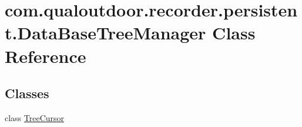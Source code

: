 \hypertarget{classcom_1_1qualoutdoor_1_1recorder_1_1persistent_1_1DataBaseTreeManager}{\section{com.\-qualoutdoor.\-recorder.\-persistent.\-Data\-Base\-Tree\-Manager Class Reference}
\label{classcom_1_1qualoutdoor_1_1recorder_1_1persistent_1_1DataBaseTreeManager}
}
\subsection*{Classes}
\begin{DoxyCompactItemize}
\item 
class \hyperlink{classcom_1_1qualoutdoor_1_1recorder_1_1persistent_1_1DataBaseTreeManager_1_1TreeCursor}{Tree\-Cursor}
\end{DoxyCompactItemize}
